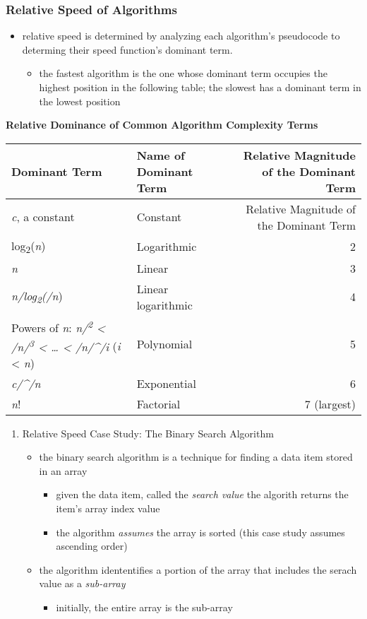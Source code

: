 \documentclass[11pt]{article}
\begin{document}
\subsubsection{Relative Speed of Algorithms}
\label{sec:org4c08a69}
\begin{itemize}
\item relative speed is determined by analyzing each algorithm's pseudocode to determing their speed function's dominant term.
\begin{itemize}
\item the fastest algorithm is the one whose dominant term occupies the highest position in the following table; the slowest has a dominant term in the lowest position
\end{itemize}
\end{itemize}
\textbf{Relative Dominance of Common Algorithm Complexity Terms}
\begin{center}
\begin{tabular}{llr}
Dominant Term & Name of Dominant Term & Relative Magnitude of the Dominant Term\\
\hline
\emph{c}, a constant & Constant & Relative Magnitude of the Dominant Term\\
log\textsubscript{2}(\emph{n}) & Logarithmic & 2\\
\emph{n} & Linear & 3\\
\emph{n/log\textsubscript{2}(/n}) & Linear logarithmic & 4\\
Powers of \emph{n}: \emph{n/\textsuperscript{2} < /n/\textsuperscript{3} < \ldots{} < /n/\^{}/i} (\emph{i} < \emph{n}) & Polynomial & 5\\
\emph{c/\^{}/n} & Exponential & 6\\
\emph{n}! & Factorial & 7 (largest)\\
\end{tabular}
\end{center}

\begin{enumerate}
\item Relative Speed Case Study: The Binary Search Algorithm
\label{sec:orgc92bae4}
\begin{itemize}
\item the binary search algorithm is a technique for finding a data item stored in an array
\begin{itemize}
\item given the data item, called the \emph{search value} the algorith returns the item's array index value
\item the algorithm \emph{assumes} the array is sorted (this case study assumes ascending order)
\end{itemize}
\item the algorithm idententifies a portion of the array that includes the serach value as a \emph{sub-array}
\begin{itemize}
\item initially, the entire array is the sub-array
\end{itemize}
\end{itemize}
\end{enumerate}
\end{document}
